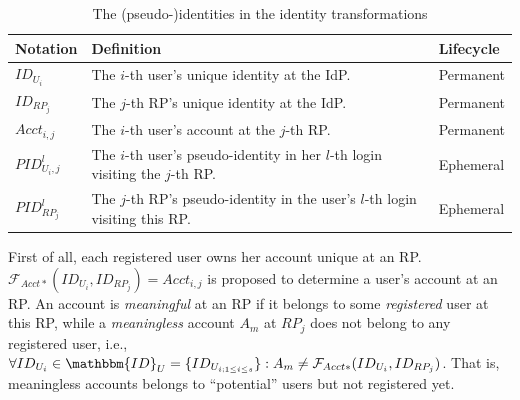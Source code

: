 \begin{table}[t]
\footnotesize
    \caption{The (pseudo-)identities in the identity transformations}
    \centering
    \begin{tabular}{|l|p{5.15cm}|l|} \hline
    {\textbf{Notation}} & {\textbf{Definition}} & {\textbf{Lifecycle}} \\ \hline
    {$ID_{U_i}$} & {The $i$-th user's unique identity at the IdP.} & {Permanent} \\ \hline
    {$ID_{RP_j}$} & {The $j$-th RP's unique identity at the IdP.} & {Permanent} \\ \hline
    {$Acct_{i,j}$} & {The $i$-th user's account at the $j$-th RP.} & {Permanent} \\ \hline
    {$PID_{U_i,j}^l$} & {The $i$-th user's pseudo-identity in her $l$-th login visiting the $j$-th RP.} & {Ephemeral} \\ \hline
    {$PID_{RP_j}^l$} & {The $j$-th RP's pseudo-identity in the user's $l$-th login visiting this RP.} & {Ephemeral} \\ \hline
    \end{tabular}
    \label{tbl:notations-dilemma}
\end{table}





First of all, each registered user owns her account unique at an RP.
$\mathcal{F}_{Acct\ast}(ID_{U_i}, ID_{RP_j}) = Acct_{i,j}$ is proposed to determine a user's account at an RP.
An account is \emph{meaningful} at an RP if it belongs to some \emph{registered} user at this RP,
while a \emph{meaningless} account $A_m$ at $RP_j$ does not belong to any registered user, i.e., $\forall ID_{U_i} \in \mathbbm{ID}_U = \{ID_{U_{i; 1 \leq i \leq s}}\}: A_m \neq \mathcal{F}_{Acct\ast}(ID_{U_i}, ID_{RP_j})$.
That is, meaningless accounts belongs to ``potential'' users but not registered yet.

